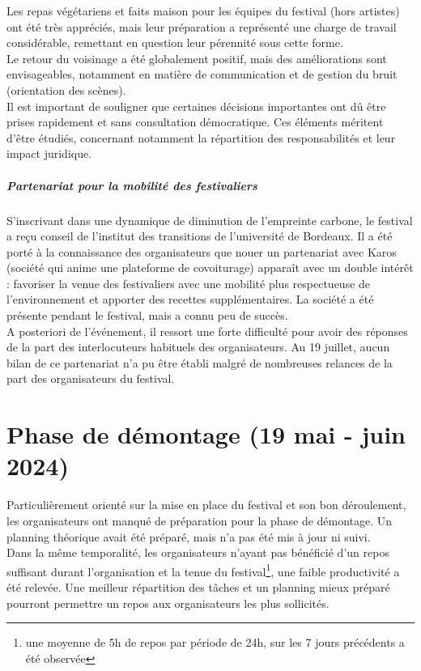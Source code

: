 \documentclass[12pt,a4paper]{report}
\begin{document}
Les repas végétariens et faits maison pour les équipes du festival (hors artistes) ont été très appréciés, mais leur préparation a représenté une charge de travail considérable, remettant en question leur pérennité sous cette forme.\\

Le retour du voisinage a été globalement positif, mais des améliorations sont envisageables, notamment en matière de communication et de gestion du bruit (orientation des scènes).\\

Il est important de souligner que certaines décisions importantes ont dû être prises rapidement et sans consultation démocratique. Ces éléments méritent d’être étudiés, concernant notamment la répartition des responsabilités et leur impact juridique.

\subparagraph{Partenariat pour la mobilité des festivaliers}
S'inscrivant dans une dynamique de diminution de l'empreinte carbone, le festival a reçu conseil de l'institut des transitions de l'université de Bordeaux. Il a été porté à la connaissance des organisateurs que nouer un partenariat avec Karos (société qui anime une plateforme de covoiturage) apparaît avec un double intérêt : favoriser la venue des festivaliers avec une mobilité plus respectueuse de l'environnement et apporter des recettes supplémentaires. La société a été présente pendant le festival, mais a connu peu de succès.\\

A posteriori de l'événement, il ressort une forte difficulté pour avoir des réponses de la part des interlocuteurs habituels des organisateurs. Au 19 juillet, aucun bilan de ce partenariat n'a pu être établi malgré de nombreuses relances de la part des organisateurs du festival.

\section{Phase de démontage (19 mai - juin 2024)}

Particulièrement orienté sur la mise en place du festival et son bon déroulement, les organisateurs ont manqué de préparation pour la phase de démontage. Un planning théorique avait été préparé, mais n'a pas été mis à jour ni suivi.\\

Dans la même temporalité, les organisateurs n'ayant pas bénéficié d'un repos suffisant durant l'organisation et la tenue du festival\footnote{une moyenne de 5h de repos par période de 24h, sur les 7 jours précédents a été observée}, une faible productivité a été relevée. Une meilleur répartition des tâches et un planning mieux préparé pourront permettre un repos aux organisateurs les plus sollicités.\\
\end{document}
